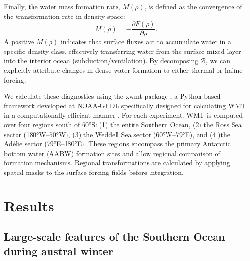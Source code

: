 \documentclass[draft]{agujournal2025}
\begin{document}
Finally, the water mass formation rate, $M(\rho)$, is defined as the convergence of the transformation rate in density space:
\begin{equation}
M(\rho) = - \frac{\partial F(\rho)}{\partial \rho}.
\end{equation}
A positive $M(\rho)$ indicates that surface fluxes act to accumulate water in a specific density class, effectively transferring water from the surface mixed layer into the interior ocean (subduction/ventilation). By decomposing $\mathcal{B}$, we can explicitly attribute changes in dense water formation to either thermal  or haline forcing.


We calculate these diagnostics using the xwmt package \cite{xwmt2024}, a Python-based framework developed at NOAA-GFDL specifically designed for calculating WMT in a computationally efficient manner \cite{drake2025water}. For each experiment, WMT is computed over four regions south of 60°S: (1) the entire Southern Ocean, (2) the Ross Sea sector (180°W–60°W), (3) the Weddell Sea sector (60°W–79°E), and (4 )the Adélie sector (79°E–180°E). These regions encompass the primary Antarctic bottom water (AABW) formation sites and allow regional comparison of formation mechanisms. Regional transformations are calculated by applying spatial masks to the surface forcing fields before integration.




\section{Results}

\subsection{Large-scale features of the Southern Ocean during austral winter}
\end{document}
